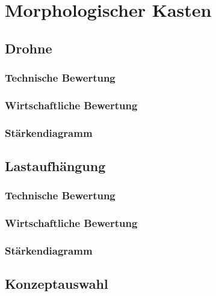 \chapter{Morphologischer Kasten}

\section{Drohne}


\subsection{Technische Bewertung}
\subsection{Wirtschaftliche Bewertung}
\subsection{Stärkendiagramm}


\section{Lastaufhängung}
\subsection{Technische Bewertung}
\subsection{Wirtschaftliche Bewertung}
\subsection{Stärkendiagramm}
\section{Konzeptauswahl}